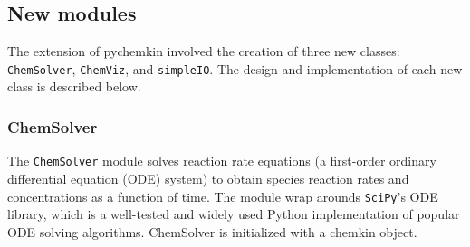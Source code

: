 \documentclass[12pt]{article}
\begin{document}
\subsection{New modules}
The extension of pychemkin involved the creation of three new classes: \texttt{ChemSolver}, \texttt{ChemViz}, and \texttt{simpleIO}. The design and implementation of each new class is described below. 
\subsubsection{ChemSolver}
The \texttt{ChemSolver} module solves reaction rate equations (a first-order ordinary differential equation (ODE) system) to obtain species reaction rates and concentrations as a function of time. The module wrap arounds \texttt{SciPy}'s ODE library, which is a well-tested and widely used Python implementation of popular ODE solving algorithms. ChemSolver is initialized with a chemkin object. 
\end{document}

